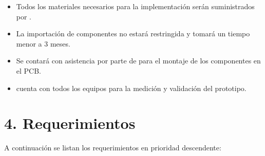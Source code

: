 \documentclass[11pt]{charter}
\begin{document}
\begin{itemize}
\item Todos los materiales necesarios para la implementación serán suministrados por \empclientename.
\item La importación de componentes no estará restringida y tomará un tiempo menor a 3 meses.
\item Se contará con asistencia por parte de \empclientename \space para el montaje de los componentes en el PCB.
\item \empclientename \space cuenta con todos los equipos para la medición y validación del prototipo.
\end{itemize}


\section{4. Requerimientos}
\label{sec:requerimientos}


A continuación se listan los requerimientos en prioridad descendente:
\end{document}
